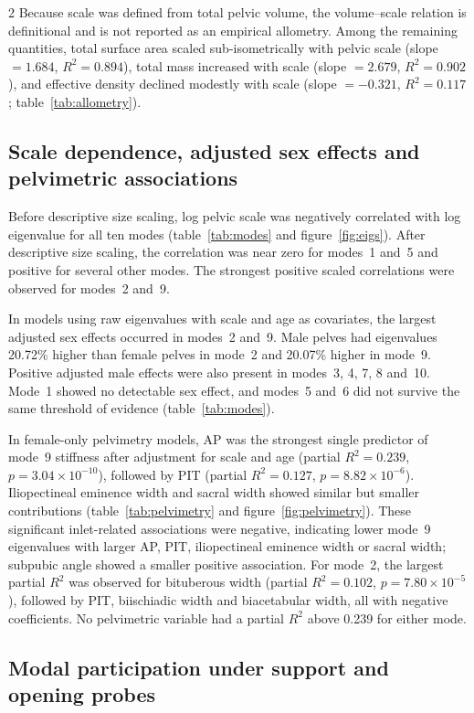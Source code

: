 \documentclass[openacc]{rsproca_new}
\begin{document}
\begin{multicols}{2}
Because scale was defined from total pelvic volume, the volume--scale relation is definitional and is not reported as an empirical allometry. Among the remaining quantities, total surface area scaled sub-isometrically with pelvic scale (slope $=1.684$, $R^2=0.894$), total mass increased with scale (slope $=2.679$, $R^2=0.902$), and effective density declined modestly with scale (slope $=-0.321$, $R^2=0.117$; table~\ref{tab:allometry}).

\subsection{Scale dependence, adjusted sex effects and pelvimetric associations}

Before descriptive size scaling, log pelvic scale was negatively correlated with log eigenvalue for all ten modes (table~\ref{tab:modes} and figure~\ref{fig:eigs}). After descriptive size scaling, the correlation was near zero for modes~1 and~5 and positive for several other modes. The strongest positive scaled correlations were observed for modes~2 and~9.

In models using raw eigenvalues with scale and age as covariates, the largest adjusted sex effects occurred in modes~2 and~9. Male pelves had eigenvalues 20.72\% higher than female pelves in mode~2 and 20.07\% higher in mode~9. Positive adjusted male effects were also present in modes~3, 4, 7, 8 and~10. Mode~1 showed no detectable sex effect, and modes~5 and~6 did not survive the same threshold of evidence (table~\ref{tab:modes}).

In female-only pelvimetry models, AP was the strongest single predictor of mode~9 stiffness after adjustment for scale and age (partial $R^2=0.239$, $p=3.04 \times 10^{-10}$), followed by PIT (partial $R^2=0.127$, $p=8.82 \times 10^{-6}$). Iliopectineal eminence width and sacral width showed similar but smaller contributions (table~\ref{tab:pelvimetry} and figure~\ref{fig:pelvimetry}). These significant inlet-related associations were negative, indicating lower mode~9 eigenvalues with larger AP, PIT, iliopectineal eminence width or sacral width; subpubic angle showed a smaller positive association. For mode~2, the largest partial $R^2$ was observed for bituberous width (partial $R^2=0.102$, $p=7.80 \times 10^{-5}$), followed by PIT, biischiadic width and biacetabular width, all with negative coefficients. No pelvimetric variable had a partial $R^2$ above 0.239 for either mode.

\subsection{Modal participation under support and opening probes}


\end{multicols}
\end{document}
